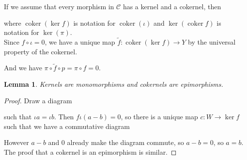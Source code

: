 \documentclass{article}
\newcommand{\cat}{\mathcal{C}}
\DeclareMathOperator{\coker}{coker}
\theoremstyle{plain}
\newtheorem{lemma}[theorem]{Lemma}
\theoremstyle{definition}
\theoremstyle{remark}
\begin{document}
If we assume that every morphism in $\cat$ has a kernel and a cokernel, then
\begin{center}
\end{center}
where $\coker(\ker f)$ is notation for $\coker(\iota)$ and $\ker(\coker f)$ is notation for $\ker(\pi)$. \\
Since $f \circ \iota = 0$, we have a unique map $\tilde{f} : \coker(\ker f) \to Y$  by the universal property of the cokernel.
\begin{center}
\end{center}

And we have $\pi \circ \tilde{f} \circ p = \pi \circ f = 0$.

\begin{lemma}
    Kernels are monomorphisms and cokernels are epimorphisms.
\end{lemma}

\begin{proof}
    Draw a diagram
    \begin{center}
    \end{center}
    such that $\iota a = \iota b$. Then $f\iota (a-b) = 0$, so there is a unique map $c : W \to \ker f$ such that we have a commutative diagram
    \begin{center}
    \end{center}
    However $a-b$ and $0$ already make the diagram commute, so $a-b = 0$, so $a = b$. \\
    The proof that a cokernel is an epimorphism is similar.
\end{proof}
\end{document}
